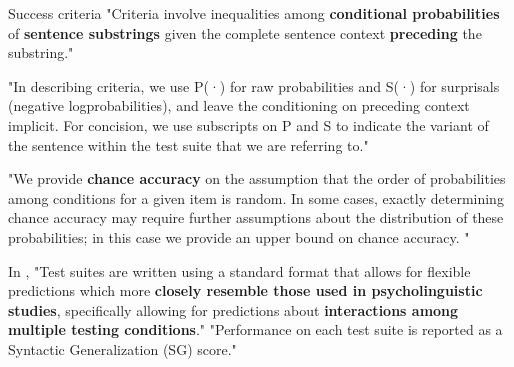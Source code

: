 Success criteria
"Criteria involve inequalities among \textbf{conditional probabilities} of \textbf{sentence substrings} given the complete sentence context \textbf{preceding} the substring."  \citep{hu2020systematic} 

"In describing criteria, we use P(·) for raw probabilities and S(·) for surprisals (negative logprobabilities), and leave the conditioning on preceding context implicit. For concision, we use subscripts on P and S to indicate the variant of the sentence within the test suite that we are referring to."   \citep{hu2020systematic} 

"We provide \textbf{chance accuracy} on the assumption that the order of probabilities among conditions for a given item is random. In some cases, exactly determining chance accuracy may require further assumptions about the distribution of these probabilities; in this case we provide an upper bound on
chance accuracy. "  \citep{hu2020systematic} 


In \citet{hu2020systematic}, "Test suites are written using a standard format that allows for flexible predictions which more \textbf{closely resemble those used in psycholinguistic studies}, specifically allowing for predictions about \textbf{interactions among multiple testing conditions}."
"Performance on each test suite is reported as a Syntactic Generalization (SG) score." \citep{hu2020systematic}




